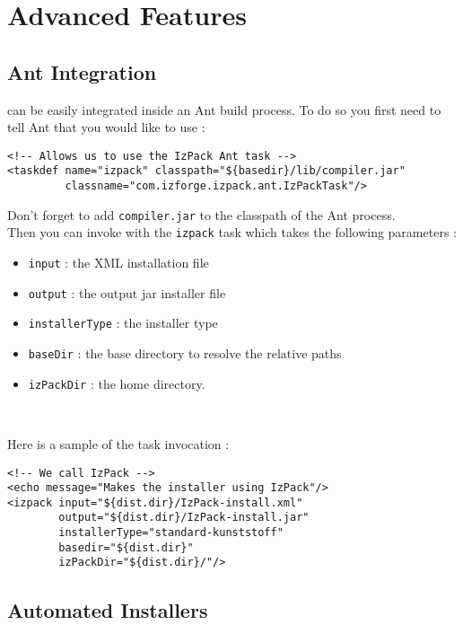 \chapter{Advanced Features}

\section{Ant Integration}

\IzPack can be easily integrated inside an Ant build process. To do so you
first need to tell Ant that you would like to use \IzPack :
\footnotesize
\begin{verbatim}
<!-- Allows us to use the IzPack Ant task -->
<taskdef name="izpack" classpath="${basedir}/lib/compiler.jar"
         classname="com.izforge.izpack.ant.IzPackTask"/>
\end{verbatim}
\normalsize

Don't forget to add \texttt{compiler.jar} to the classpath of the Ant process.\\

Then you can invoke \IzPack with the \texttt{izpack} task which takes the
following parameters :
\begin{itemize}

  \item \texttt{input} : the XML installation file
  \item \texttt{output} : the output jar installer file
  \item \texttt{installerType} : the installer type
  \item \texttt{baseDir} : the base directory to resolve the relative paths
  \item \texttt{izPackDir} : the \IzPack home directory.
  
\end{itemize}\

Here is a sample of the task invocation :\\
\footnotesize
\begin{verbatim}
<!-- We call IzPack -->
<echo message="Makes the installer using IzPack"/>
<izpack input="${dist.dir}/IzPack-install.xml"
        output="${dist.dir}/IzPack-install.jar"
        installerType="standard-kunststoff"
        basedir="${dist.dir}"
        izPackDir="${dist.dir}/"/>
\end{verbatim}
\normalsize

\section{Automated Installers}

